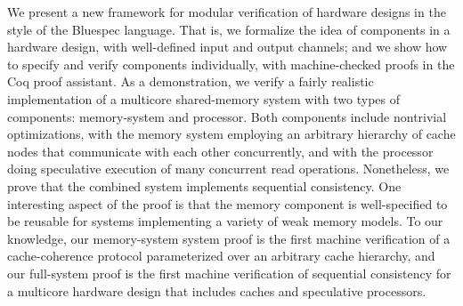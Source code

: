 We present a new framework for modular verification of hardware designs in the
style of the Bluespec language.  That is, we formalize the idea of components
in a hardware design, with well-defined input and output channels; and we show
how to specify and verify components individually, with machine-checked proofs
in the Coq proof assistant.  As a demonstration, we verify a fairly realistic
implementation of a multicore shared-memory system with two types of
components:  memory-system and processor.  Both components include nontrivial
optimizations, with the memory system employing an arbitrary hierarchy of cache
nodes that communicate with each other concurrently, and with the processor
doing speculative execution of many concurrent read operations.  Nonetheless,
we prove that the combined system implements sequential consistency.  One
interesting aspect of the proof is that the memory component is well-specified
to be reusable for systems implementing a variety of weak memory models.  To
our knowledge, our memory-system system proof is the first machine verification
of a cache-coherence protocol parameterized over an arbitrary cache hierarchy,
and our full-system proof is the first machine verification of sequential
consistency for a multicore hardware design that includes caches and
speculative processors.

